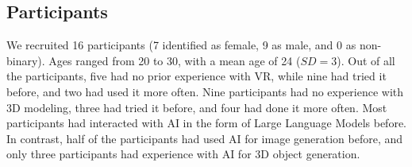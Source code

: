 \subsection{Participants}
We recruited 16 participants (7 identified as female, 9 as male, and 0 as non-binary). Ages ranged from 20 to 30, with a mean age of 24 ($SD=3$). 
Out of all the participants, five had no prior experience with VR, while nine had tried it before, and two had used it more often. 
Nine participants had no experience with 3D modeling, three had tried it before, and four had done it more often. 
Most participants had interacted with AI in the form of Large Language Models before. In contrast, half of the participants had used AI for image generation before, and only three participants had experience with AI for 3D object generation. 
